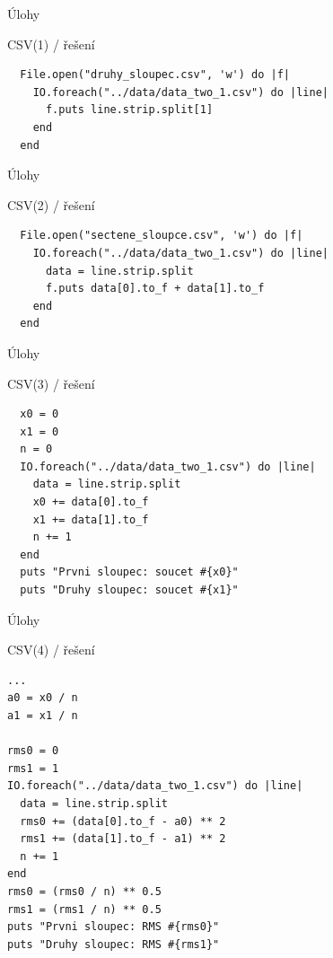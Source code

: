 \documentclass{beamer}
\begin{document}
\begin{frame}[fragile]{Úlohy}
  \begin{block}{CSV(1) / řešení}
    \scriptsize
\begin{verbatim}
  File.open("druhy_sloupec.csv", 'w') do |f|
    IO.foreach("../data/data_two_1.csv") do |line|
      f.puts line.strip.split[1]
    end
  end
\end{verbatim}
  \end{block}
\end{frame}

\begin{frame}[fragile]{Úlohy}
  \begin{block}{CSV(2) / řešení}
    \scriptsize
\begin{verbatim}
  File.open("sectene_sloupce.csv", 'w') do |f|
    IO.foreach("../data/data_two_1.csv") do |line|
      data = line.strip.split
      f.puts data[0].to_f + data[1].to_f
    end
  end
\end{verbatim}
  \end{block}
\end{frame}

\begin{frame}[fragile]{Úlohy}
  \begin{block}{CSV(3) / řešení}
    \scriptsize
\begin{verbatim}
  x0 = 0
  x1 = 0
  n = 0
  IO.foreach("../data/data_two_1.csv") do |line|
    data = line.strip.split
    x0 += data[0].to_f
    x1 += data[1].to_f
    n += 1
  end
  puts "Prvni sloupec: soucet #{x0}"
  puts "Druhy sloupec: soucet #{x1}"
\end{verbatim}
  \end{block}
\end{frame}

\begin{frame}[fragile]{Úlohy}
  \begin{block}{CSV(4) / řešení}
    \scriptsize
\begin{verbatim}
...
a0 = x0 / n
a1 = x1 / n

rms0 = 0
rms1 = 1
IO.foreach("../data/data_two_1.csv") do |line|
  data = line.strip.split
  rms0 += (data[0].to_f - a0) ** 2
  rms1 += (data[1].to_f - a1) ** 2
  n += 1
end
rms0 = (rms0 / n) ** 0.5
rms1 = (rms1 / n) ** 0.5
puts "Prvni sloupec: RMS #{rms0}"
puts "Druhy sloupec: RMS #{rms1}"
\end{verbatim}
  \end{block}
\end{frame}
\end{document}
